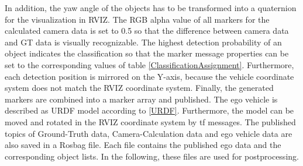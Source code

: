 In addition, the yaw angle of the objects has to be transformed into a quaternion for the visualization in RVIZ. The RGB alpha value of all markers for the calculated camera data is set to 0.5 so that the difference between camera data and GT data is visually recognizable. 
The highest detection probability of an object indicates the classification so that the marker message properties can be set to the corresponding values of table \ref{ClassificationAssignment}. Furthermore, each detection position is mirrored on the Y-axis, because the vehicle coordinate system does not match the RVIZ coordinate system. Finally, the generated markers are combined into a marker array and published.
The ego vehicle is described as URDF model according to \ref{URDF}.
Furthermore, the model can be moved and rotated in the RVIZ coordinate system by tf messages. 
The published topics of Ground-Truth data, Camera-Calculation data and ego vehicle data are also saved in a Rosbag file. Each file contains the published ego data and the corresponding object lists. In the following, these files are used for postprocessing.